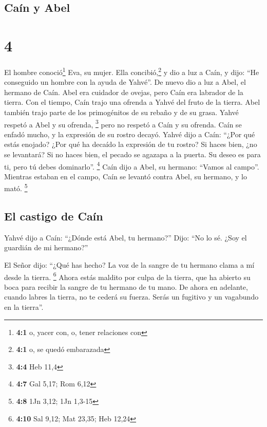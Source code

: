 \hypertarget{cauxedn-y-abel}{%
\subsection{Caín y Abel}\label{cauxedn-y-abel}}

\hypertarget{section-3}{%
\section{4}\label{section-3}}

 El hombre conoció\footnote{\textbf{4:1} o, yacer con, o,
  tener relaciones con} Eva, su mujer. Ella concibió,\footnote{\textbf{4:1}
  o, se quedó embarazada} y dio a luz a Caín, y dijo: ``He conseguido un
hombre con la ayuda de Yahvé''.  De nuevo dio a luz a
Abel, el hermano de Caín. Abel era cuidador de ovejas, pero Caín era
labrador de la tierra.  Con el tiempo, Caín trajo una
ofrenda a Yahvé del fruto de la tierra.  Abel también
trajo parte de los primogénitos de su rebaño y de su grasa. Yahvé
respetó a Abel y su ofrenda, \footnote{\textbf{4:4} Heb 11,4}
 pero no respetó a Caín y su ofrenda. Caín se enfadó
mucho, y la expresión de su rostro decayó.  Yahvé dijo a
Caín: ``¿Por qué estás enojado? ¿Por qué ha decaído la expresión de tu
rostro?  Si haces bien, ¿no se levantará? Si no haces
bien, el pecado se agazapa a la puerta. Su deseo es para ti, pero tú
debes dominarlo''. \footnote{\textbf{4:7} Gal 5,17; Rom 6,12}
 Caín dijo a Abel, su hermano: ``Vamos al campo''.
Mientras estaban en el campo, Caín se levantó contra Abel, su hermano, y
lo mató. \footnote{\textbf{4:8} 1Jn 3,12; 1Jn 1,3-15}

\hypertarget{el-castigo-de-cauxedn}{%
\subsection{El castigo de Caín}\label{el-castigo-de-cauxedn}}

 Yahvé dijo a Caín: ``¿Dónde está Abel, tu hermano?''
Dijo: ``No lo sé. ¿Soy el guardián de mi hermano?''

 El Señor dijo: ``¿Qué has hecho? La voz de la sangre de
tu hermano clama a mí desde la tierra. \footnote{\textbf{4:10} Sal 9,12;
  Mat 23,35; Heb 12,24}  Ahora estás maldito por culpa de
la tierra, que ha abierto su boca para recibir la sangre de tu hermano
de tu mano.  De ahora en adelante, cuando labres la
tierra, no te cederá su fuerza. Serás un fugitivo y un vagabundo en la
tierra''.

